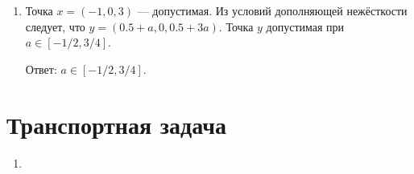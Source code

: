 \documentclass[12pt]{article}
\begin{document}
\begin{enumerate}
\item %
Точка $x = (-1, 0, 3)$ — допустимая. 
Из условий дополняющей нежёсткости следует, что $y = (0.5 + a, 0, 0.5 + 3a)$.
Точка $y$ допустимая при $a \in [-1/2, 3/4]$.

Ответ: $a \in [-1/2, 3/4]$.

\end{enumerate}

\section*{Транспортная задача}

\begin{enumerate}
  \item 
\end{enumerate}
\end{document}
